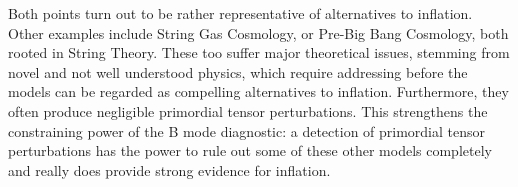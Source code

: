 \documentclass[a4paper,10pt]{article}
\begin{document}
Both points turn out to be rather representative of alternatives to inflation. Other examples include String Gas Cosmology, or Pre-Big Bang Cosmology, both rooted in String Theory. These too suffer major theoretical issues, stemming from novel and not well understood physics, which require addressing before the models can be regarded as compelling alternatives to inflation. Furthermore, they often produce negligible primordial tensor perturbations. This strengthens the constraining power of the B mode diagnostic: a detection of primordial tensor perturbations has the power to rule out some of these other models completely and really does provide strong evidence for inflation.




\end{document}
